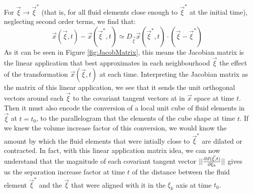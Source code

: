 \documentclass[11pt, a4paper]{article} %
\DeclareRobustCommand{\mybox}[2][gray!10]{%
\begin{tcolorbox}[   %
        left=0.2cm,
        right=0.2cm,
        top=0.15cm,
        bottom=0.15cm,
        colback=#1,
        colframe=#1,
        width=\dimexpr\textwidth\relax, 
        enlarge left by=0mm,
        boxsep=5pt,
        arc=0pt,outer arc=0pt,
        ]
        #2
\end{tcolorbox}
}
\begin{document}
\mybox{
For $\vec{\xi}\rightarrow \vec{\xi}^*$ (that is, for all fluid elements close enough to $\vec{\xi}^*$ at the initial time), neglecting second order terms, we find that:
\begin{equation}
\vec{x}(\vec{\xi},t)-\vec{x}(\vec{\xi}^*,t)\simeq D_{\vec{\xi}}\vec{x}(\vec{\xi}^*,t)\cdot (\vec{\xi}-\vec{\xi}^*)
\end{equation}
As it can be seen in Figure \ref{fig:JacobMatrix}, this means the Jacobian matrix is the linear application that best approximates in each neighbourhood $\vec{\xi}$ the effect of the transformation $\vec{x}(\vec{\xi},t)$ at each time. Interpreting the Jacobian matrix as the matrix of this linear application, we see that it sends the unit orthogonal vectors around each $\vec{\xi}$ to the covariant tangent vectors at in $\vec{x}$ space at time $t$. Then it must also encode the conversion of a local unit cube of fluid elements in $\vec{\xi}$ at $t=t_0$, to the parallelogram that the elements of the cube shape at time $t$. If we knew the volume increase factor of this conversion, we would know the amount by which the fluid elements that were intially close to $\vec{\xi}^*$ are dilated or contracted. In fact, with this linear application matrix idea, we can now understand that the magnitude of each covariant tangent vector $||\pdv{\vec{x}(\vec{\xi},t)}{\xi_k}||$ gives us the separation increase factor at time $t$ of the distance between the fluid element $\vec{\xi}^*$ and the $\vec{\xi}$ that were aligned with it in the $\xi_k$ axis at time $t_0$.\\

}
\end{document}
